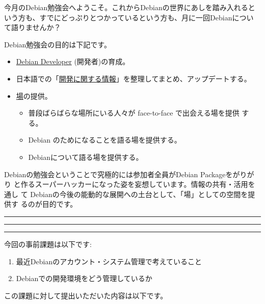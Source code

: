 \documentclass[mingoth,a4paper]{jsarticle}
\begin{document}
\begin{multicols}{2}
 

 今月のDebian勉強会へようこそ。これからDebianの世界にあしを踏み入れると
 いう方も、すでにどっぷりとつかっているという方も、月に一回Debianについ
 て語りませんか？

 Debian勉強会の目的は下記です。

 \begin{itemize}
 \item \underline{Debian Developer} (開発者)の育成。
 \item 日本語での「\underline{開発に関する情報}」を整理してまとめ、アップデートする。
 \item \underline{場}の提供。
 \begin{itemize}
  \item 普段ばらばらな場所にいる人々が face-to-face で出会える場を提供
	する。
  \item Debian のためになることを語る場を提供する。
  \item Debianについて語る場を提供する。
 \end{itemize}
 \end{itemize}		

 Debianの勉強会ということで究極的には参加者全員がDebian Packageをがりがり
 と作るスーパーハッカーになった姿を妄想しています。情報の共有・活用を通し
 て Debianの今後の能動的な展開への土台として、「場」としての空間を提供す
 るのが目的です。

\end{multicols}

\newpage

\begin{minipage}[b]{0.2\hsize}
 \colorbox{titleback}{}
\end{minipage}
\begin{minipage}[b]{0.8\hsize}
\hrule
\vspace{2mm}
\hrule
\begin{multicols}{2}
\tableofcontents
\end{multicols}
\vspace{2mm}
\hrule
\end{minipage}


今回の事前課題は以下です:
\begin{enumerate}
 \item 最近Debianのアカウント・システム管理で考えていること
 \item Debianでの開発環境をどう管理しているか
\end{enumerate}
この課題に対して提出いただいた内容は以下です。
\begin{multicols}{2}
{\small
 
}
\end{multicols}
\end{document}
